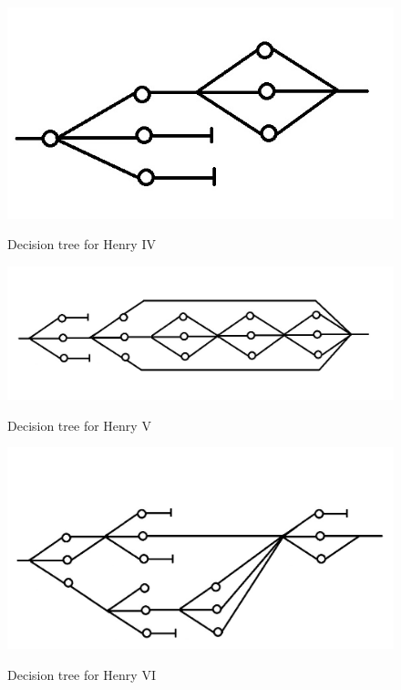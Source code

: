 \documentclass{scrreprt}
\begin{document}
\begin{figure}
	\includegraphics{Henry4Paint.jpg}
	\begin{center}
		Decision tree for Henry IV
	\end{center}
\end{figure}

\begin{figure}
	\includegraphics[scale=0.8]{Henry5.jpg}
	\begin{center}
		Decision tree for Henry V
	\end{center}
\end{figure}

\begin{figure}
	\includegraphics[scale=0.85]{Henry6.jpg}
	\begin{center}
		Decision tree for Henry VI
	\end{center}
\end{figure}
\end{document}
